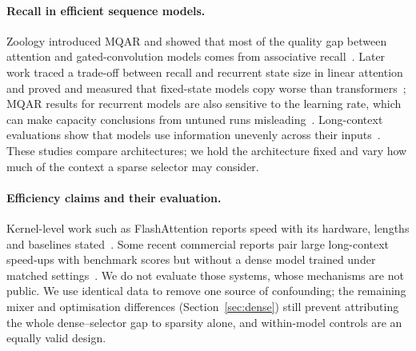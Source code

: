 \paragraph{Recall in efficient sequence models.} Zoology introduced MQAR and showed that most of the quality gap
between attention and gated-convolution models comes from associative recall~\cite{arora2024zoology}. Later work
traced a trade-off between recall and recurrent state size in linear attention~\cite{arora2024based} and proved and measured that fixed-state
models copy worse than transformers~\cite{jelassi2024repeat}; MQAR results for recurrent models are also sensitive to the
learning rate, which can make capacity conclusions from untuned runs misleading~\cite{okpekpe2025revisiting}. Long-context evaluations show that models use
information unevenly across their inputs~\cite{liu2024lost}. These studies compare architectures; we hold the
architecture fixed and vary how much of the context a sparse selector may consider.

\paragraph{Efficiency claims and their evaluation.} Kernel-level work such as FlashAttention reports speed with its
hardware, lengths and baselines stated~\cite{dao2022flashattention}. Some recent commercial reports pair large
long-context speed-ups with benchmark scores but without a dense model trained under matched
settings~\cite{subq2026,appen2026}. We do not evaluate those systems, whose mechanisms are not public. We use identical data to remove one source of confounding;
the remaining mixer and optimisation differences (Section~\ref{sec:dense}) still prevent attributing the whole
dense--selector gap to sparsity alone, and within-model controls are an equally valid design.
